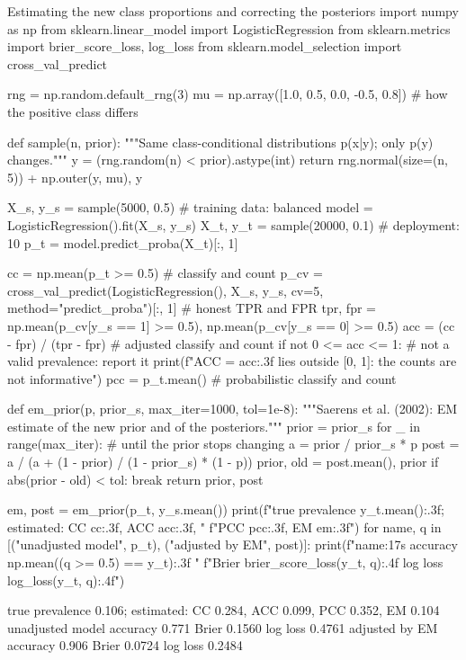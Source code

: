 \begin{pylisting}[label={lst:labelshift}]{Estimating the new class proportions and correcting the posteriors}
import numpy as np
from sklearn.linear_model import LogisticRegression
from sklearn.metrics import brier_score_loss, log_loss
from sklearn.model_selection import cross_val_predict

rng = np.random.default_rng(3)
mu = np.array([1.0, 0.5, 0.0, -0.5, 0.8])          # how the positive class differs

def sample(n, prior):
    """Same class-conditional distributions p(x|y); only p(y) changes."""
    y = (rng.random(n) < prior).astype(int)
    return rng.normal(size=(n, 5)) + np.outer(y, mu), y

X_s, y_s = sample(5000, 0.5)                       # training data: balanced
model = LogisticRegression().fit(X_s, y_s)
X_t, y_t = sample(20000, 0.1)                      # deployment: 10%
p_t = model.predict_proba(X_t)[:, 1]

cc = np.mean(p_t >= 0.5)                           # classify and count
p_cv = cross_val_predict(LogisticRegression(), X_s, y_s, cv=5,
                         method="predict_proba")[:, 1]          # honest TPR and FPR
tpr, fpr = np.mean(p_cv[y_s == 1] >= 0.5), np.mean(p_cv[y_s == 0] >= 0.5)
acc = (cc - fpr) / (tpr - fpr)                     # adjusted classify and count
if not 0 <= acc <= 1:                              # not a valid prevalence: report it
    print(f"ACC = {acc:.3f} lies outside [0, 1]: the counts are not informative")
pcc = p_t.mean()                                   # probabilistic classify and count

def em_prior(p, prior_s, max_iter=1000, tol=1e-8):
    """Saerens et al. (2002): EM estimate of the new prior and of the posteriors."""
    prior = prior_s
    for _ in range(max_iter):                      # until the prior stops changing
        a = prior / prior_s * p
        post = a / (a + (1 - prior) / (1 - prior_s) * (1 - p))
        prior, old = post.mean(), prior
        if abs(prior - old) < tol:
            break
    return prior, post

em, post = em_prior(p_t, y_s.mean())
print(f"true prevalence {y_t.mean():.3f}; estimated: CC {cc:.3f}, ACC {acc:.3f}, "
      f"PCC {pcc:.3f}, EM {em:.3f}")
for name, q in [("unadjusted model", p_t), ("adjusted by EM", post)]:
    print(f"{name:17s} accuracy {np.mean((q >= 0.5) == y_t):.3f}   "
          f"Brier {brier_score_loss(y_t, q):.4f}   log loss {log_loss(y_t, q):.4f}")
\end{pylisting}
\begin{pyoutput}
true prevalence 0.106; estimated: CC 0.284, ACC 0.099, PCC 0.352, EM 0.104
unadjusted model  accuracy 0.771   Brier 0.1560   log loss 0.4761
adjusted by EM    accuracy 0.906   Brier 0.0724   log loss 0.2484
\end{pyoutput}

